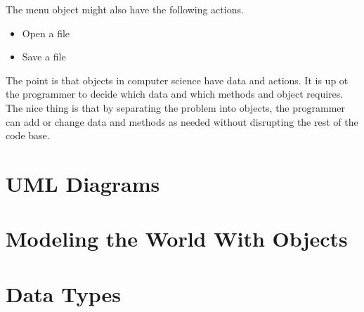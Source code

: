 The menu object might also have the following actions.
\begin{itemize}
	\item Open a file
	\item Save a file
\end{itemize}

The point is that objects in computer science have data and actions. It is up ot the programmer to decide which data and which methods and object requires. The nice thing is that by separating the problem into objects, the programmer can add or change data and methods as needed without disrupting the rest of the code base.


\section{UML Diagrams}


\section{Modeling the World With Objects}

\section{Data Types}

